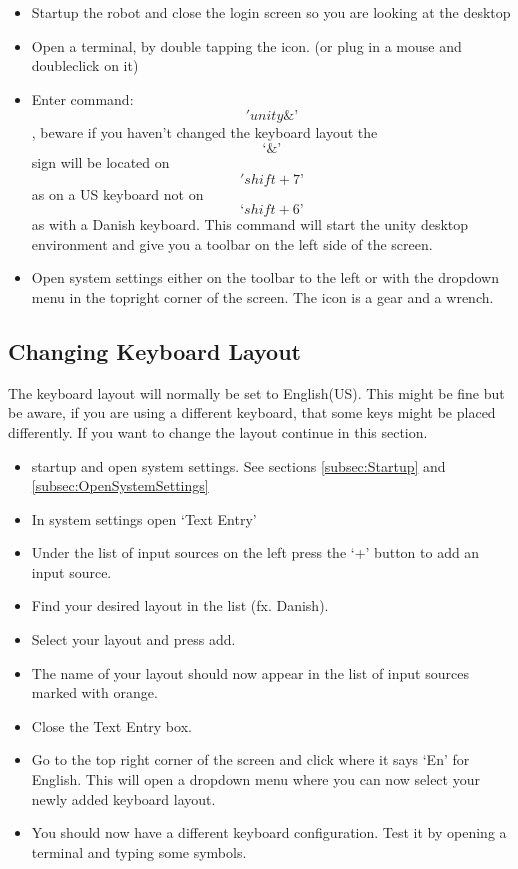 \documentclass{article}
\begin{document}
\begin{itemize}
	\item Startup the robot and close the login screen so you are looking at the desktop
	\item Open a terminal, by double tapping the icon. (or plug in a mouse and doubleclick on it)
	\item Enter command: $$'unity\&’$$, beware if you haven't changed the keyboard layout the $$‘\&’$$ sign will be located on $$'shift+7’$$ as on a US keyboard not on $$‘shift+6’$$ as with a Danish keyboard. This command will start the unity desktop environment and give you a toolbar on the left side of the screen.
	\item Open system settings either on the toolbar to the left or with the dropdown menu in the topright corner of the screen. The icon is a gear and a wrench. 
\end{itemize}

\subsection{Changing Keyboard Layout}
The keyboard layout will normally be set to English(US). This might be fine but be aware, if you are using a different keyboard, that some keys might be placed differently. If you want to change the layout continue in this section.

\begin{itemize}
\item startup and open system settings. See sections \ref{subsec:Startup} and \ref{subsec:OpenSystemSettings}
\item In system settings open ‘Text Entry’
\item Under the list of input sources on the left press the ‘+’ button to add an input source. 
\item Find your desired layout in the list (fx. Danish). 
\item Select your layout and press add. 
\item The name of your layout should now appear in the list of input sources marked with orange.
\item Close the Text Entry box.
\item Go to the top right corner of the screen and click where it says ‘En’ for English. This will open a dropdown menu where you can now select your newly added keyboard layout. 
\item You should now have a different keyboard configuration. Test it by opening a terminal and typing some symbols.
\end{itemize}
\end{document}
